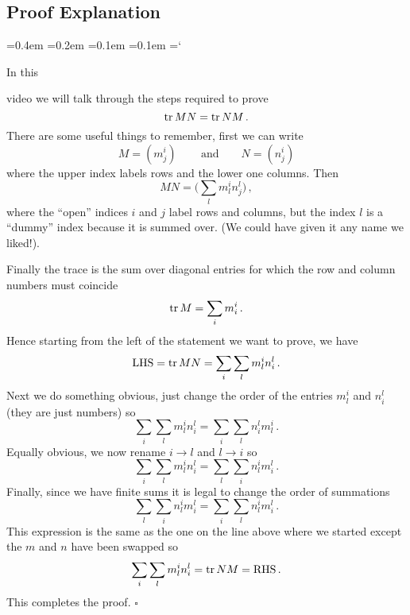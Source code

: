 
\subsection*{Proof Explanation}

{\ttfamily
{}\font=0.4em
\font=0.2em
\font=0.1em
\font=0.1em
\hyphenchar\font=`\-


\hypertarget{scripts_properties_of_matrices_trace_proof}{In this} 
video we will talk through the steps required to prove
$$
\operatorname{tr} MN=\operatorname{tr} NM\, .
$$
There are some useful things to remember, first we can write
$$
M=(m^i_j)\, \qquad \mbox{and}\qquad N=(n^i_j)
$$
where the upper index labels rows and the lower one columns.
Then 
$$
MN=\big(\sum_l m^i_l n^l_j\big)\, ,
$$
where the ``open'' indices $i$ and $j$ label rows and columns, but the index $l$ is a ``dummy'' index because it is summed over. (We could have given it any name we liked!).

Finally the trace is the sum over diagonal entries for which the 
row and column numbers must coincide
$$
\operatorname{tr} M = \sum_i m^i_i\, .
$$
Hence starting from the left of the statement we want to prove, we have
$$
\mbox{LHS}= \operatorname{tr} MN = \sum_i \sum_l m^i_l n^l_i\, .
$$
Next we do something obvious, just change the order of the entries $m^i_l$ and $n^l_i$ (they are just numbers) so
$$
 \sum_i \sum_l m^i_l n^l_i= \sum_i \sum_l n^l_i m^i_l\, . 
$$
Equally obvious, we now rename $i\to l$ and $l\to i$ so
$$
 \sum_i \sum_l m^i_l n^l_i = \sum_l \sum_i n^i_l m^l_i\, . 
$$
Finally, since we have finite sums it is legal to change the order of summations
$$
 \sum_l \sum_i n^i_l m^l_i= \sum_i \sum_l n^i_l m^l_i\, . 
$$
This expression is the same as the one on the line above where we 
started except the $m$ and $n$ have been swapped so
$$
 \sum_i \sum_l m^i_l n^l_i= \operatorname{tr} NM =\mbox{RHS}\, . 
$$
This completes the proof. $\square$
} %

\newpage
